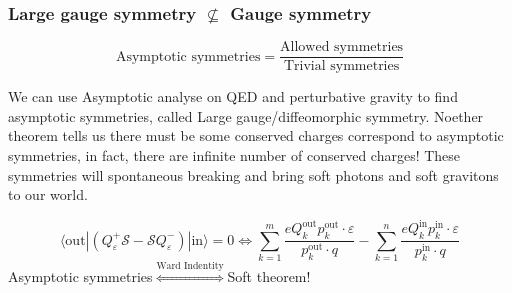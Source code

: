 \documentclass[aspectratio=169]{beamer}%
\begin{document}
	\begin{frame}
		\frametitle{Large gauge symmetry $\nsubseteq$ Gauge symmetry}
		\begin{definition}
			\[\text{Asymptotic symmetries}=\frac{\text{Allowed symmetries}}{\text{Trivial symmetries}}\]
		\end{definition}
		
		We can use Asymptotic analyse on QED and perturbative gravity to find asymptotic symmetries, called Large gauge/diffeomorphic symmetry. Noether theorem tells us there must be some conserved charges correspond to asymptotic symmetries, in fact, there are infinite number of conserved charges! These symmetries will spontaneous breaking and bring soft photons and soft gravitons to our world. 
		
		\begin{equation}
			\langle\mathrm{out}|\left(Q_\varepsilon^+\mathcal{S}-\mathcal{S}Q_\varepsilon^-\right)|\mathrm{in}\rangle=0\iff
			\sum_{k=1}^m\frac{eQ_k^\mathrm{out}p_k^\mathrm{out}\cdot\varepsilon}{p_k^\mathrm{out}\cdot q}-\sum_{k=1}^n\frac{eQ_k^\mathrm{in}p_k^\mathrm{in}\cdot\varepsilon}{p_k^\mathrm{in}\cdot q}
		\end{equation}
		Asymptotic symmetries$\overset{\text{Ward Indentity}}{\iff}$Soft theorem!
	\end{frame}
\end{document}

